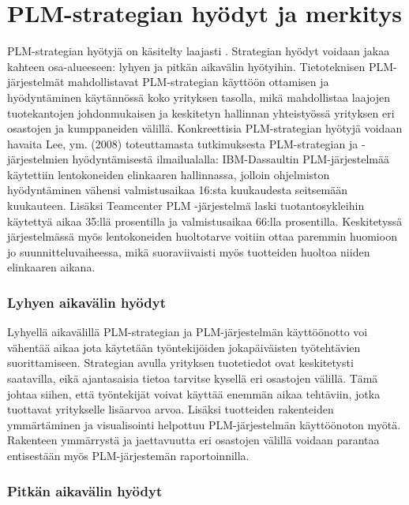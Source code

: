 \section{PLM-strategian hyödyt ja merkitys} \label{PLM strategian hyödyt}

PLM-strategian hyötyjä on käsitelty laajasti  \cite{alemanni_key_2008}  \cite{rivest_product_2012}. Strategian hyödyt voidaan jakaa kahteen osa-alueeseen: lyhyen ja pitkän aikavälin hyötyihin. Tietoteknisen PLM-järjestelmät mahdollistavat PLM-strategian käyttöön ottamisen ja hyödyntäminen käytännössä koko yrityksen tasolla, mikä mahdollistaa laajojen tuotekantojen johdonmukaisen ja keskitetyn hallinnan yhteistyössä yrityksen eri osastojen ja kumppaneiden välillä.
Konkreettisia PLM-strategian hyötyjä voidaan havaita Lee, ym. (2008) toteuttamasta tutkimuksesta PLM-strategian ja -järjestelmien hyödyntämisestä ilmailualalla: IBM-Dassaultin PLM-järjestelmää käytettiin lentokoneiden elinkaaren hallinnassa, jolloin ohjelmiston hyödyntäminen vähensi valmistusaikaa 16:sta kuukaudesta seitsemään kuukauteen. Lisäksi Teamcenter PLM -järjestelmä laski tuotantosykleihin käytettyä aikaa 35:llä prosentilla ja valmistusaikaa 66:lla prosentilla. Keskitetyssä järjestelmässä myös lentokoneiden huoltotarve voitiin ottaa paremmin huomioon jo suunnitteluvaiheessa, mikä suoraviivaisti myös tuotteiden huoltoa niiden elinkaaren aikana.  \cite{lee_product_2008}

\subsubsection{Lyhyen aikavälin hyödyt} \label{Lyhyen aikavälin hyödyt}

Lyhyellä aikavälillä PLM-strategian ja PLM-järjestelmän käyttöönotto voi vähentää aikaa jota käytetään työntekijöiden jokapäiväisten työtehtävien suorittamiseen. Strategian avulla yrityksen tuotetiedot ovat keskitetysti saatavilla, eikä ajantasaisia tietoa tarvitse kysellä eri osastojen välillä. Tämä johtaa siihen, että työntekijät voivat käyttää enemmän aikaa tehtäviin, jotka tuottavat yritykselle lisäarvoa arvoa. Lisäksi tuotteiden rakenteiden ymmärtäminen ja visualisointi helpottuu PLM-järjestelmän käyttöönoton myötä. Rakenteen ymmärrystä ja jaettavuutta eri osastojen välillä voidaan parantaa entisestään myös PLM-järjestemän raportoinnilla.  \cite{alemanni_key_2008}

\subsubsection{Pitkän aikavälin hyödyt} \label{Pitkän aikavälin hyödyt}

